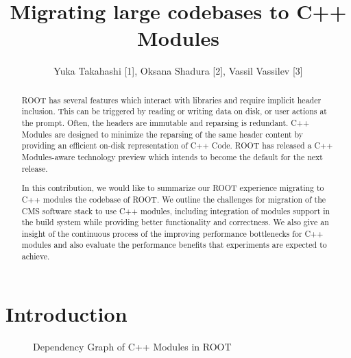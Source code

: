 \documentclass[12pt]{iopart}
\begin{document}
\title{Migrating large codebases to C++ Modules}

\author{Yuka Takahashi [1], Oksana Shadura [2], Vassil Vassilev [3]}
\address{[1] the University of Tokyo, [2] CERN, [3] Princeton University}

\begin{abstract}
ROOT has several features which interact with libraries and require implicit header inclusion. This can be triggered by reading or writing data on disk, or user actions at the prompt. Often, the headers are immutable and reparsing is redundant. C++ Modules are designed to minimize the reparsing of the same header content by providing an efficient on-disk representation of C++ Code. ROOT has released a C++ Modules-aware technology preview which intends to become the default for the next release.

In this contribution, we would like to summarize our ROOT experience migrating to C++ modules the codebase of ROOT. We outline the challenges for migration of the CMS software stack to use C++ modules, including integration of modules support in the build system while providing better functionality and correctness. We also give an insight of the continuous process of the improving performance bottlenecks for C++ modules and also evaluate the performance benefits that experiments are expected to achieve.

\end{abstract}

\maketitle

\section{Introduction}


\begin{figure}[!h]
  \centering
  \caption{Dependency Graph of C++ Modules in ROOT}
  \label{fig:pchandpcm}
\end{figure}
\end{document}
